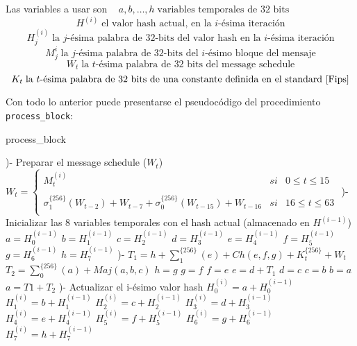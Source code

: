 Las variables a usar son $\; \; \; a, b, \dots , h \; \text{variables temporales de $32$ bits}$
$$H^{(i)} \; \text{el valor hash actual, en la $i$-ésima iteración} $$
$$H^{(i)}_j \; \text{la $j$-ésima palabra de $32$-bits del valor hash en la $i$-ésima iteración} $$
$$M^i_j \; \text{la $j$-ésima palabra de $32$-bits del $i$-ésimo bloque del mensaje} $$
$$W_t \; \text{la $t$-ésima palabra de $32$ bits del message schedule} $$
$$K_t \; \text{la $t$-ésima palabra de $32$ bits de una constante definida en el standard \cite{Fips}} $$

Con todo lo anterior puede presentarse el pseudocódigo del procedimiento \texttt{process\_block}: 
\begin{algorithm}[H]
\caption{process\_block}
\begin{algorithmic}[0]
    )- Preparar el message schedule ($W_t$)
    \State
    \State \indent $W_t = \left\{ \begin{array}{lcc}
                            M^{(i)}_t &   si  & 0 \leq t \leq 15 \\
                         \\ \sigma_1^{\{256\}}(W_{t-2}) + W_{t-7} + \sigma_0^{\{256\}}(W_{t-15}) + W_{t-16} &  si & 16 \leq t \leq 63 \\
                     \end{array} \right. $                   
    )- Inicializar las 8 variables temporales con el hash actual (almacenado en $H^{(i-1)}$)
    \State \indent $a = H^{(i-1)}_0 $
    \State \indent $b = H^{(i-1)}_1 $
    \State \indent $c = H^{(i-1)}_2 $
    \State \indent $d = H^{(i-1)}_3 $
    \State \indent $e = H^{(i-1)}_4 $
    \State \indent $f = H^{(i-1)}_5 $
    \State \indent $g = H^{(i-1)}_6 $
    \State \indent $h = H^{(i-1)}_7 $
    )-
        \State $T_1 = h + \sum^{\{256\}}_1(e) + Ch(e, f, g) + K^{\{256\}}_t + W_t $
        \State $T_2 = \sum^{\{256\}}_0(a) + Maj(a,b,c)$
        \State $h = g$
        \State $g = f$
        \State $f = e$
        \State $e = d + T_1$
        \State $d = c$
        \State $c = b$
        \State $b = a$
        \State $a = T 1 + T_2$
    \EndFor
    \State
    )- Actualizar el i-ésimo valor hash
    \State  \indent $H^{(i)}_0  = a + H^{(i-1)}_0 $
    \State  \indent $H^{(i)}_1  = b + H^{(i-1)}_1 $
    \State  \indent $H^{(i)}_2  = c + H^{(i-1)}_2 $
    \State  \indent $H^{(i)}_3  = d + H^{(i-1)}_3 $
    \State  \indent $H^{(i)}_4  = e + H^{(i-1)}_4 $
    \State  \indent $H^{(i)}_5  = f + H^{(i-1)}_5 $
    \State  \indent $H^{(i)}_6  = g + H^{(i-1)}_6 $
    \State  \indent $H^{(i)}_7  = h + H^{(i-1)}_7 $
\end{algorithmic}
\end{algorithm}

